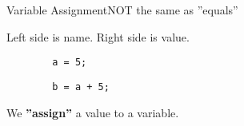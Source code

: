 \begin{frame}[fragile]{Variable Assignment}{NOT the same as ''equals''}
    \begin{block}{} Left side is name. Right side is value. \end{block}
    {
    \Huge \begin{verbatim}
        a = 5;
    \end{verbatim}
    \begin{verbatim}
        b = a + 5;
    \end{verbatim}
    }
    \begin{block}{} We \textbf{''assign''} a value to a variable. \end{block}
\end{frame}
